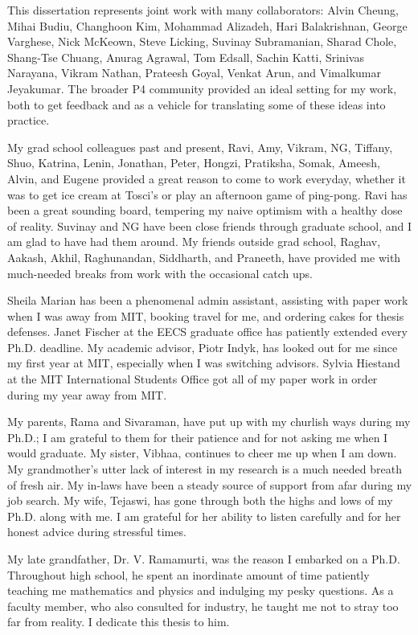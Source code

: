 This dissertation represents joint work with many collaborators: Alvin Cheung,
Mihai Budiu, Changhoon Kim, Mohammad Alizadeh, Hari Balakrishnan, George
Varghese, Nick McKeown, Steve Licking, Suvinay Subramanian, Sharad Chole,
Shang-Tse Chuang, Anurag Agrawal, Tom Edsall, Sachin Katti, Srinivas Narayana,
Vikram Nathan, Prateesh Goyal, Venkat Arun, and Vimalkumar Jeyakumar. The
broader P4 community provided an ideal setting for my work, both to get
feedback and as a vehicle for translating some of these ideas into practice. 

My grad school colleagues past and present, Ravi, Amy, Vikram, NG, Tiffany,
Shuo, Katrina, Lenin, Jonathan, Peter, Hongzi, Pratiksha, Somak, Ameesh, Alvin,
and Eugene provided a great reason to come to work everyday, whether it was to
get ice cream at Tosci's or play an afternoon game of ping-pong. Ravi has been
a great sounding board, tempering my naive optimism with a healthy dose of
reality. Suvinay and NG have been close friends through graduate school, and I
am glad to have had them around. My friends outside grad school, Raghav,
Aakash, Akhil, Raghunandan, Siddharth, and Praneeth, have provided me with
much-needed breaks from work with the occasional catch ups.

Sheila Marian has been a phenomenal admin assistant, assisting with paper work
when I was away from MIT, booking travel for me, and ordering cakes for thesis
defenses. Janet Fischer at the EECS graduate office has patiently extended
every Ph.D.  deadline. My academic advisor, Piotr Indyk, has looked out for me
since my first year at MIT, especially when I was switching advisors.  Sylvia
Hiestand at the MIT International Students Office got all of my paper work in
order during my year away from MIT.

My parents, Rama and Sivaraman, have put up with my churlish ways during my
Ph.D.; I am grateful to them for their patience and for not asking me when I
would graduate. My sister, Vibhaa, continues to cheer me up when I am down.  My
grandmother's utter lack of interest in my research is a much needed breath of
fresh air. My in-laws have been a steady source of support from afar during my
job search. My wife, Tejaswi, has gone through both the highs and lows of my
Ph.D. along with me. I am grateful for her ability to listen carefully and for
her honest advice during stressful times. 

My late grandfather, Dr. V. Ramamurti, was the reason I embarked on a Ph.D.
Throughout high school, he spent an inordinate amount of time patiently
teaching me mathematics and physics and indulging my pesky questions. As a
faculty member, who also consulted for industry, he taught me not to stray too
far from reality. I dedicate this thesis to him.
